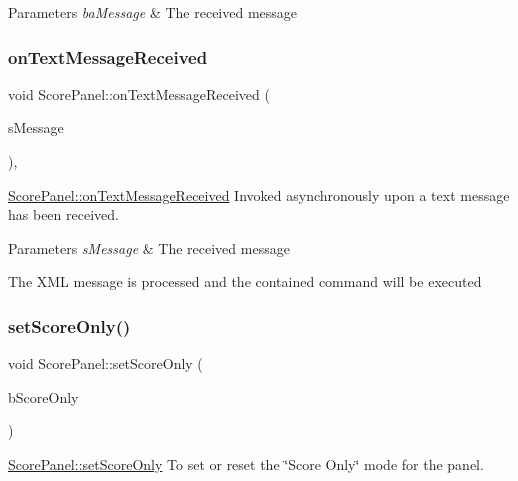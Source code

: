 \begin{DoxyParams}{Parameters}
{\em ba\+Message} & The received message \\
\hline
\end{DoxyParams}
\mbox{\label{classScorePanel_af3d7aa48c21c4e63d398dac5a2266130}} 
\subsubsection{\texorpdfstring{on\+Text\+Message\+Received}{onTextMessageReceived}}
{\footnotesize\ttfamily void Score\+Panel\+::on\+Text\+Message\+Received (\begin{DoxyParamCaption}\item[{Q\+String}]{s\+Message }\end{DoxyParamCaption})\hspace{0.3cm}{\ttfamily [protected]}, {\ttfamily [slot]}}



\mbox{\hyperlink{classScorePanel_af3d7aa48c21c4e63d398dac5a2266130}{Score\+Panel\+::on\+Text\+Message\+Received}} Invoked asynchronously upon a text message has been received. 


\begin{DoxyParams}{Parameters}
{\em s\+Message} & The received message\\
\hline
\end{DoxyParams}
The X\+ML message is processed and the contained command will be executed \mbox{\label{classScorePanel_a0573b55e1bd67e61ac88361262440923}} 
\subsubsection{\texorpdfstring{set\+Score\+Only()}{setScoreOnly()}}
{\footnotesize\ttfamily void Score\+Panel\+::set\+Score\+Only (\begin{DoxyParamCaption}\item[{bool}]{b\+Score\+Only }\end{DoxyParamCaption})}



\mbox{\hyperlink{classScorePanel_a0573b55e1bd67e61ac88361262440923}{Score\+Panel\+::set\+Score\+Only}} To set or reset the \char`\"{}\+Score Only\char`\"{} mode for the panel. 


